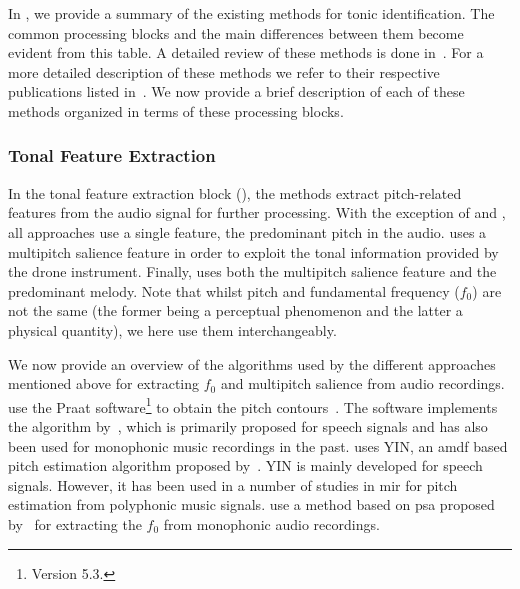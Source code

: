 In , we provide a summary of the existing methods for tonic identification. The common processing blocks and the main differences between them become evident from this table. A detailed review of these methods is done in~\cite{Gulati2014Tonic}. For a more detailed description of these methods we refer to their respective publications listed in~. We now provide a brief description of each of these methods organized in terms of these processing blocks.


\subsubsection{Tonal Feature Extraction}
\label{Feature Extraction}

In the tonal feature extraction block (), the methods extract pitch-related
features from the audio signal for further processing. With the exception of \cite{salamon2012multipitch} and \cite{gulati2012two}, all approaches use a single feature, the predominant pitch in the audio. \cite{salamon2012multipitch} uses a multipitch salience feature in order to exploit the tonal information provided by the drone instrument. Finally, \cite{gulati2012two} uses both the multipitch salience feature and the predominant melody. Note that whilst pitch and fundamental frequency ($f_0$) are not the same (the former being a perceptual phenomenon and the latter a physical quantity), we here use them interchangeably.

We now provide an overview of the algorithms used by the different approaches mentioned above for extracting $f_0$ and multipitch salience from audio recordings. \cite{ranjani2011carnatic} use the Praat software\footnote{Version 5.3.} to obtain the pitch contours~\citep{BoersmaPaul2001}. The software implements the algorithm by~\cite{boersma1993accurate}, which is primarily proposed for speech signals and has also been used for monophonic music recordings in the past. \cite{Ashwin_Istanbul2012} uses YIN, an \gls{amdf} based pitch estimation algorithm proposed by~\cite{DeCheveigne2002}. YIN is mainly developed for speech signals. However, it has been used in a number of studies in \gls{mir} for pitch estimation from polyphonic music signals. \cite{Sengupta2005b} use a method based on \gls{psa} proposed by~\cite{AKDatta_1996} for extracting the $f_0$ from monophonic audio recordings. %

